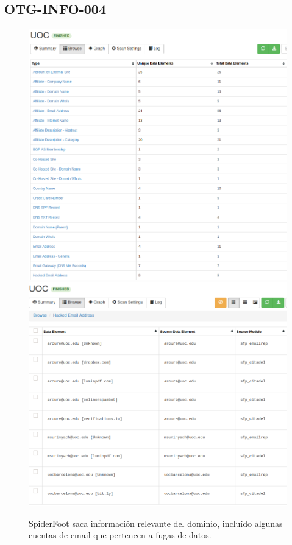 \documentclass[10pt,a4paper]{article}
\begin{document}
\subsection{OTG-INFO-004}
\label{ann:otg-info-004}
\begin{figure}[h!]
  \centering
  \includegraphics[scale=0.25]{spider2.png}
  \includegraphics[scale=0.25]{hacked.png}
  \caption{SpiderFoot saca información relevante del dominio, incluído algunas cuentas de email que pertencen a fugas de datos.}
  \label{fig:otg-info-004-1}
\end{figure}
\end{document}
